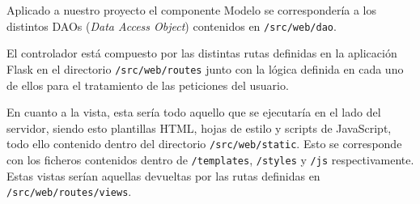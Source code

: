 Aplicado a nuestro proyecto el componente Modelo se correspondería a los distintos DAOs (\textit{Data Access Object}) contenidos en \texttt{/src/web/dao}.

El controlador está compuesto por las distintas rutas definidas en la aplicación Flask en el directorio \texttt{/src/web/routes} junto con la lógica definida en cada uno de ellos para el tratamiento de las peticiones del usuario.

En cuanto a la vista, esta sería todo aquello que se ejecutaría en el lado del servidor, siendo esto plantillas HTML, hojas de estilo y scripts de JavaScript, todo ello contenido dentro del directorio \texttt{/src/web/static}. Esto se corresponde con los ficheros contenidos dentro de \texttt{/templates}, \texttt{/styles} y \texttt{/js} respectivamente. Estas vistas serían aquellas devueltas por las rutas definidas en \texttt{/src/web/routes/views}.